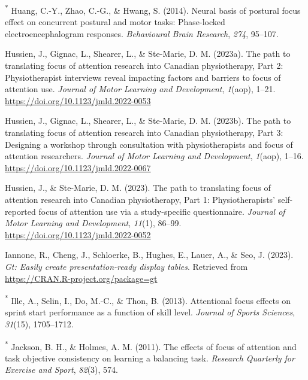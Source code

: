 \documentclass[
  man, donotrepeattitle,floatsintext]{apa7}
\newlength{\cslhangindent}
\newlength{\cslentryspacingunit} %
\newenvironment{CSLReferences}[2] %
 {%
  \setlength{\parindent}{0pt}
  \ifodd #1
  \let\oldpar\par
  \def\par{\hangindent=\cslhangindent\oldpar}
  \fi
  \setlength{\parskip}{#2\cslentryspacingunit}
 }%
 {}
\begin{document}
\begin{CSLReferences}{1}{0}
\leavevmode{}%
\textsuperscript{*} Huang, C.-Y., Zhao, C.-G., \& Hwang, S. (2014). Neural basis of postural focus effect on concurrent postural and motor tasks: Phase-locked electroencephalogram responses. \emph{Behavioural Brain Research}, \emph{274}, 95--107.

\leavevmode{}%
Hussien, J., Gignac, L., Shearer, L., \& Ste-Marie, D. M. (2023a). The path to translating focus of attention research into {Canadian} physiotherapy, {Part} 2: {Physiotherapist} interviews reveal impacting factors and barriers to focus of attention use. \emph{Journal of Motor Learning and Development}, \emph{1}(aop), 1--21. \url{https://doi.org/10.1123/jmld.2022-0053}

\leavevmode{}%
Hussien, J., Gignac, L., Shearer, L., \& Ste-Marie, D. M. (2023b). The path to translating focus of attention research into {Canadian} physiotherapy, {Part} 3: {Designing} a workshop through consultation with physiotherapists and focus of attention researchers. \emph{Journal of Motor Learning and Development}, \emph{1}(aop), 1--16. \url{https://doi.org/10.1123/jmld.2022-0067}

\leavevmode{}%
Hussien, J., \& Ste-Marie, D. M. (2023). The path to translating focus of attention research into {Canadian} physiotherapy, {Part} 1: {Physiotherapists}' self-reported focus of attention use via a study-specific questionnaire. \emph{Journal of Motor Learning and Development}, \emph{11}(1), 86--99. \url{https://doi.org/10.1123/jmld.2022-0052}

\leavevmode{}%
Iannone, R., Cheng, J., Schloerke, B., Hughes, E., Lauer, A., \& Seo, J. (2023). \emph{Gt: Easily create presentation-ready display tables}. Retrieved from \url{https://CRAN.R-project.org/package=gt}

\leavevmode{}%
\textsuperscript{*} Ille, A., Selin, I., Do, M.-C., \& Thon, B. (2013). Attentional focus effects on sprint start performance as a function of skill level. \emph{Journal of Sports Sciences}, \emph{31}(15), 1705--1712.

\leavevmode{}%
\textsuperscript{*} Jackson, B. H., \& Holmes, A. M. (2011). The effects of focus of attention and task objective consistency on learning a balancing task. \emph{Research Quarterly for Exercise and Sport}, \emph{82}(3), 574.


\end{CSLReferences}
\end{document}
